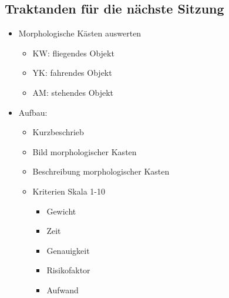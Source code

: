 \documentclass[a4paper,10pt,fleqn]{article}
\begin{document}
\subsection*{Traktanden für die nächste Sitzung}
\begin{itemize}
    \item Morphologische Kästen auswerten
    \begin{itemize}
    	\item KW: fliegendes Objekt
    	\item YK: fahrendes Objekt
    	\item AM: stehendes Objekt
	\end{itemize}
    \item Aufbau:
	    \begin{itemize}
		    \item Kurzbeschrieb
		    \item Bild morphologischer Kasten
		    \item Beschreibung morphologischer Kasten
		    \item Kriterien Skala 1-10
		    \begin{itemize}
		    	\item Gewicht
		    	\item Zeit
		    	\item Genauigkeit
		    	\item Risikofaktor
		    	\item Aufwand
		    \end{itemize}
	    \end{itemize}
    
\end{itemize}
%
\end{document}
